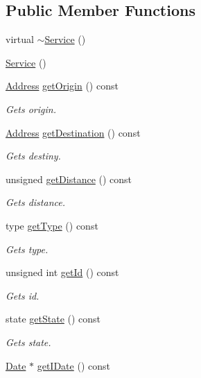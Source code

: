 \subsection*{Public Member Functions}
\begin{DoxyCompactItemize}
\item 
virtual \hyperlink{class_service_af6c3577b59652ac817d1d76aaccee904}{$\sim$\+Service} ()
\item 
\hyperlink{class_service_acc246c9f7ed3c51e2d91d10fe257513f}{Service} ()
\item 
\hyperlink{class_address}{Address} \hyperlink{class_service_a186e0115cc0197181b4e060bfe4cd502}{get\+Origin} () const
\begin{DoxyCompactList}\small\item\em Gets origin. \end{DoxyCompactList}\item 
\hyperlink{class_address}{Address} \hyperlink{class_service_a2aabf308bd77e1de07afa28d5ff72b08}{get\+Destination} () const
\begin{DoxyCompactList}\small\item\em Gets destiny. \end{DoxyCompactList}\item 
unsigned \hyperlink{class_service_a7b36594e1a24656f065f7d41b79bb718}{get\+Distance} () const
\begin{DoxyCompactList}\small\item\em Gets distance. \end{DoxyCompactList}\item 
type \hyperlink{class_service_a75f96cd94a42b604ff179343576e1bba}{get\+Type} () const
\begin{DoxyCompactList}\small\item\em Gets type. \end{DoxyCompactList}\item 
unsigned int \hyperlink{class_service_a5a19731d4fa91658afe908167fe66ad6}{get\+Id} () const
\begin{DoxyCompactList}\small\item\em Gets id. \end{DoxyCompactList}\item 
state \hyperlink{class_service_adf7f337e38c8de87e82b42f15c7ccad3}{get\+State} () const
\begin{DoxyCompactList}\small\item\em Gets state. \end{DoxyCompactList}\item 
\hyperlink{class_date}{Date} $\ast$ \hyperlink{class_service_a3a8b665eff7933227303dc070bb29485}{get\+I\+Date} () const

\end{DoxyCompactItemize}
